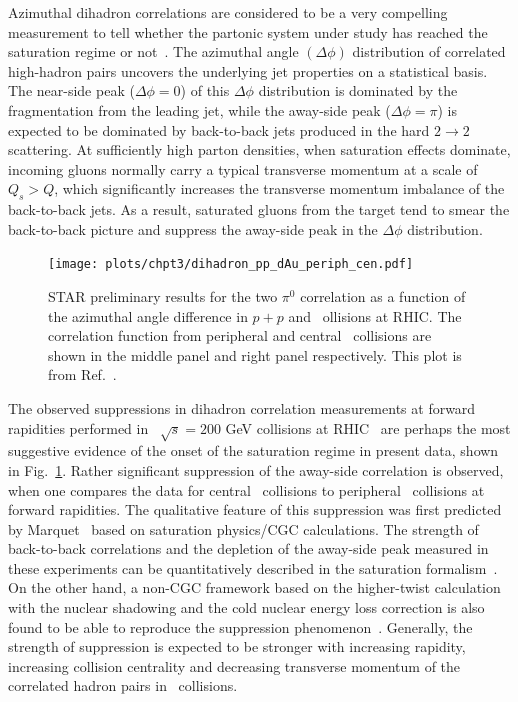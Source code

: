 Azimuthal dihadron correlations are considered to be a very compelling
measurement to tell whether the partonic system under study has reached the
saturation regime or not~\cite{Kharzeev:2004bw}. The azimuthal angle
$(\Delta\phi)$ distribution of correlated high-\pt hadron pairs uncovers the
underlying jet properties on a statistical basis. The near-side peak
($\Delta\phi=0$) of this $\Delta\phi$ distribution is dominated by the
fragmentation from the leading jet, while the away-side peak ($\Delta\phi=\pi$)
is expected to be dominated by back-to-back jets produced in the hard
$2\rightarrow2$ scattering. At sufficiently high parton densities, when
saturation effects dominate, incoming gluons normally carry a typical transverse
momentum at a scale of $Q_{s}>Q$, which significantly increases the transverse
momentum imbalance of the back-to-back jets. As a result, saturated gluons from
the target tend to smear the back-to-back picture and suppress the away-side
peak in the $\Delta\phi$ distribution.

\begin{figure}
\centering
\texttt{[image: plots/chpt3/dihadron\_pp\_dAu\_periph\_cen.pdf]}
\caption[Conditional yield of dihadron correlations in $d+$Au collisions at STAR]{
STAR preliminary results for the two $\pi^{0}$ correlation as a function of the
azimuthal angle difference in $p+p$ and \dA\ ollisions at RHIC. The correlation
function from peripheral and central \dA\ collisions are shown in the middle panel and right
panel respectively.
This plot is from Ref.~\cite{Braidot:2010ig}.}
\label{fig:dihadron_dAu}
\end{figure}

The observed suppressions in dihadron correlation measurements at forward
rapidities performed in \dA\ $\sqrt{s}=200$ GeV collisions at
RHIC~\cite{Adare:2011sc,Braidot:2010ig,Li:2012bn} are perhaps the most
suggestive evidence of the onset of the saturation regime in present data, shown
in Fig.~\ref{fig:dihadron_dAu}. Rather significant suppression of the away-side
correlation is observed, when one compares the data for central \dA\ collisions
to peripheral \dA\ collisions at forward rapidities. The qualitative feature of
this suppression was first predicted by Marquet~\cite{Marquet:2007vb} based on
saturation physics/CGC calculations. The strength of back-to-back correlations
and the depletion of the away-side peak measured in these experiments can be
quantitatively described in the saturation
formalism~\cite{Albacete:2010pg,Stasto:2011ru,Lappi:2012nh}. On the other hand,
a non-CGC framework based on the higher-twist calculation with the nuclear shadowing and the
cold nuclear energy loss correction is also found to be able to reproduce the
suppression phenomenon~\cite{Kang:2011bp}. Generally, the strength of suppression
is expected to be stronger with increasing rapidity, increasing collision centrality
and decreasing transverse momentum of the correlated hadron pairs in \dA\ collisions.


